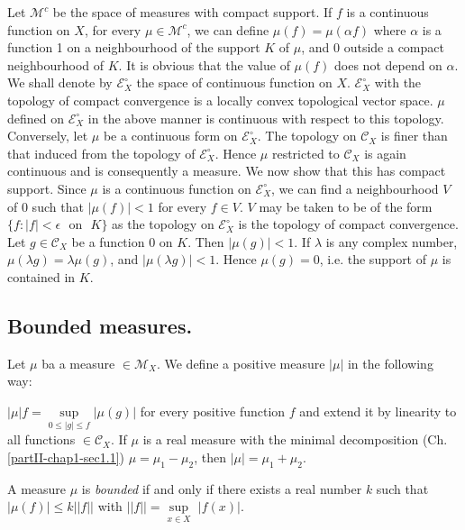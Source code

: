 Let $\mathscr{M}^c$ be the space of measures with compact support. If $f$ is a
continuous function on $X$, for every $\mu\in \mathscr{M}^c$, we can
define $\mu(f)=\mu(\alpha f)$\pageoriginale 
where $\alpha$ is a function 1 on a
neighbourhood of the support $K$ of $\mu$, and $0$ outside a compact
neighbourhood of $K$. It is obvious that the value of $\mu(f)$ does
not depend on $\alpha$. We shall denote by $\mathscr{E}^\circ_X$  the space of
continuous function on $X$. $\mathscr{E}^\circ_X$ with the topology of compact
convergence is a locally convex topological vector space. $\mu$
defined on $\mathscr{E}^\circ_X$ in the above manner is continuous with respect
to this topology. Conversely, let $\mu$ be a continuous form on
$\mathscr{E}^\circ_X$. The topology on $\mathscr{C}_X$ is finer than that
induced from the topology of $\mathscr{E}^\circ_X$. Hence $\mu$ restricted to
$\mathscr{C}_X$ is again continuous and is consequently a measure. We
now show that this has compact support. Since $\mu$ is a continuous
function on $\mathscr{E}^\circ_X$, we can find a neighbourhood $V$ of $0$ such
that $|\mu(f)|<1$ for every $f \in V$. $V$ may be taken  
to be of the form $\{f:| f | < \epsilon\text{~ on~ } K\}$ as the topology on
$\mathscr{E}^\circ_X$ is the topology of compact convergence. Let $g \in
\mathscr{C}_X$ be a function  $0$ on $K$. Then $| \mu(g)| < 1$. If
$\lambda$ is any complex number, $\mu (\lambda g)= \lambda \mu (g)$,
and $| \mu(\lambda g)| <1$. Hence $\mu(g)=0$, i.e. the support of
$\mu$ is contained in $K$. 

\subsection{Bounded measures.}\label{partII-chap1-sec1.4}%

Let $\mu$ ba a measure $\in \mathscr{M}_X$. We define a positive
measure $| \mu |$ in the following way:   

$| \mu | f=\sup\limits_{0 \leq | g | \leq f } | \mu (g)|$ for every
positive function $f$ and extend it by linearity to all functions $\in
\mathscr{C}_X$. If $\mu$ is a real measure with the minimal
decomposition (Ch. \ref{partII-chap1-sec1.1}) $\mu=\mu_1-\mu_2$, then
$|\mu|=\mu_1+\mu_2$.  

\begin{defi*}%
 A measure $\mu$ is {\em bounded} if and only if there exists a real
 number $k$ such that $| \mu(f)| \leq  k|| f ||$ with $ || f || =
 \sup\limits_{x \in X}$ $| f(x)|$. 
\end{defi*}

